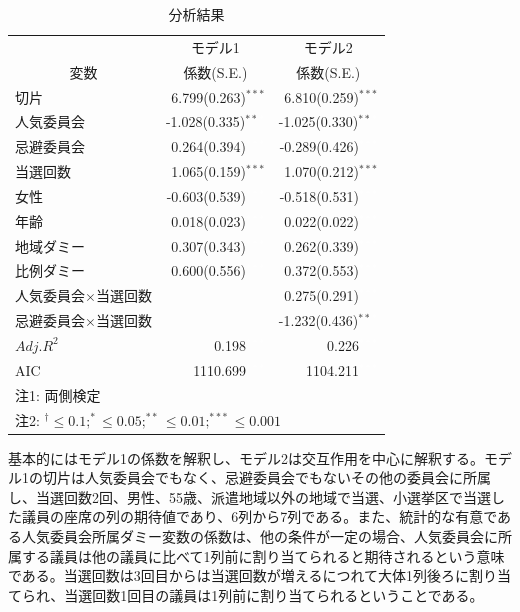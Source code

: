 \documentclass[12pt, a4j]{jsarticle}
\begin{document}
\begin{table}[htbp]
	\centering
	\caption{分析結果} \label{tab:分析結果}
	\begin{tabular}{lrr}
		\toprule
		& \multicolumn{1}{c}{モデル1} & \multicolumn{1}{c}{モデル2} \\
		\multicolumn{1}{c}{変数} & \multicolumn{1}{c}{係数(S.E.)} & \multicolumn{1}{c}{係数(S.E.)} \\
		\midrule
		切片& 6.799(0.263)$^{***}$& 6.810(0.259)$^{***}$ \\
		人気委員会 & -1.028(0.335)$^{**}$\textcolor{white}{$^{*}$}&  -1.025(0.330)$^{**}$\textcolor{white}{$^{*}$}\\
		忌避委員会 & 0.264(0.394)\textcolor{white}{$^{***}$}& -0.289(0.426)\textcolor{white}{$^{***}$} \\
		当選回数 & 1.065(0.159)$^{***}$ & 1.070(0.212)$^{***}$ \\
		女性 & -0.603(0.539)\textcolor{white}{$^{***}$} & -0.518(0.531)\textcolor{white}{$^{***}$}\\
		年齢 & 0.018(0.023)\textcolor{white}{$^{***}$} & 0.022(0.022)\textcolor{white}{$^{***}$}\\
		地域ダミー & 0.307(0.343)\textcolor{white}{$^{***}$} & 0.262(0.339)\textcolor{white}{$^{***}$} \\
		比例ダミー & 0.600(0.556)\textcolor{white}{$^{***}$} & 0.372(0.553)\textcolor{white}{$^{***}$} \\
		人気委員会$\times$当選回数 & & 0.275(0.291)\textcolor{white}{$^{***}$}\\
		忌避委員会$\times$当選回数 & & -1.232(0.436)$^{**}$\textcolor{white}{$^{*}$}\\
		\midrule
		$Adj. R^2$ & 0.198\textcolor{white}{$^{***}$} & 0.226\textcolor{white}{$^{***}$} \\
		AIC & 1110.699\textcolor{white}{$^{***}$} & 1104.211\textcolor{white}{$^{***}$} \\
		\midrule
		\multicolumn{3}{l}{注1: 両側検定} \\
		\multicolumn{3}{l}{注2: $^\dagger \leq 0.1{; } ^{*} \leq 0.05{; } ^{**} \leq 0.01{; } ^{***} \leq 0.001$} \\
		\bottomrule
	\end{tabular}
\end{table}

基本的にはモデル1の係数を解釈し、モデル2は交互作用を中心に解釈する。モデル1の切片は人気委員会でもなく、忌避委員会でもないその他の委員会に所属し、当選回数2回、男性、55歳、派遣地域以外の地域で当選、小選挙区で当選した議員の座席の列の期待値であり、6列から7列である。また、統計的な有意である人気委員会所属ダミー変数の係数は、他の条件が一定の場合、人気委員会に所属する議員は他の議員に比べて1列前に割り当てられると期待されるという意味である。当選回数は3回目からは当選回数が増えるにつれて大体1列後ろに割り当てられ、当選回数1回目の議員は1列前に割り当てられるということである。\par
\end{document}
